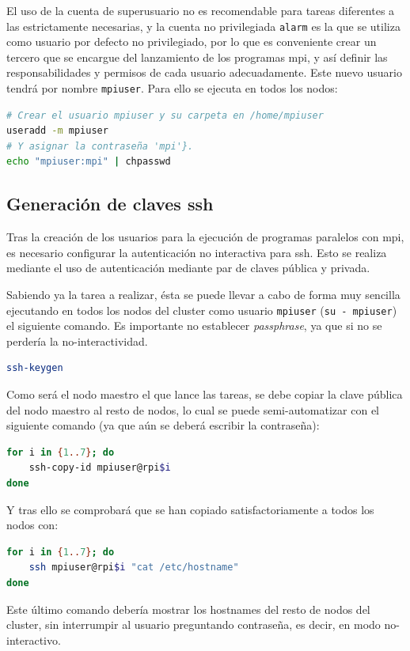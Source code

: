 El uso de la cuenta de superusuario no es recomendable para tareas diferentes a las estrictamente necesarias, y la cuenta no privilegiada \texttt{alarm} es la que se utiliza como usuario por defecto no privilegiado, por lo que es conveniente crear un tercero que se encargue del lanzamiento de los programas \acrshort{mpi}, y así definir las responsabilidades y permisos de cada usuario adecuadamente. Este nuevo usuario tendrá por nombre \texttt{mpiuser}. Para ello se ejecuta en todos los nodos:

\begin{lstlisting}[language=bash]
# Crear el usuario mpiuser y su carpeta en /home/mpiuser
useradd -m mpiuser
# Y asignar la contraseña 'mpi'}.
echo "mpiuser:mpi" | chpasswd
\end{lstlisting}

\subsection{Generación de claves \acrshort{ssh}}
Tras la creación de los usuarios para la ejecución de programas paralelos con \acrshort{mpi}, es necesario configurar la autenticación no interactiva para \acrshort{ssh}. Esto se realiza mediante el uso de autenticación mediante par de claves pública y privada.

Sabiendo ya la tarea a realizar, ésta se puede llevar a cabo de forma muy sencilla ejecutando en todos los nodos del cluster como usuario \texttt{mpiuser} (\texttt{su - mpiuser}) el siguiente comando. Es importante no establecer \textit{passphrase}, ya que si no se perdería la no-interactividad.
\begin{lstlisting}[language=bash]
ssh-keygen
\end{lstlisting}

Como será el nodo maestro el que lance las tareas, se debe copiar la clave pública del nodo maestro al resto de nodos, lo cual se puede semi-automatizar con el siguiente comando (ya que aún se deberá escribir la contraseña):

\begin{lstlisting}[language=bash]
for i in {1..7}; do
    ssh-copy-id mpiuser@rpi$i
done
\end{lstlisting}

Y tras ello se comprobará que se han copiado satisfactoriamente a todos los nodos con:
\begin{lstlisting}[language=bash]
for i in {1..7}; do
    ssh mpiuser@rpi$i "cat /etc/hostname"
done
\end{lstlisting}
Este último comando debería mostrar los hostnames del resto de nodos del cluster, sin interrumpir al usuario preguntando contraseña, es decir, en modo no-interactivo.


